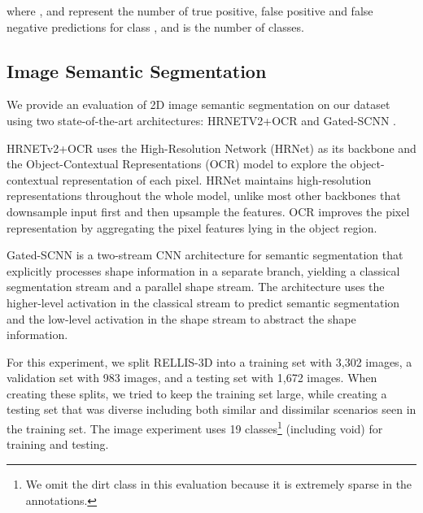 \documentclass[letterpaper, 10 pt, conference]{ieeeconf}
\begin{document}
where ,  and  represent the number of true positive, false positive and false negative predictions for class , and  is the number of classes.

\subsection{Image Semantic Segmentation}
We provide an evaluation of 2D image semantic segmentation on our dataset using two state-of-the-art architectures: HRNETV2+OCR \cite{WangSCJDZLMTWLX19, Yuan2019} and Gated-SCNN \cite{Takikawa2019}.

 HRNETv2+OCR uses the High-Resolution Network (HRNet)\cite{WangSCJDZLMTWLX19} as its backbone and the Object-Contextual Representations (OCR) model \cite{Yuan2019} to explore the object-contextual representation of each pixel. HRNet maintains high-resolution representations throughout the whole model, unlike most other backbones that downsample input first and then upsample the features. OCR improves the pixel representation by aggregating the pixel features lying in the object region. 

Gated-SCNN\cite{Takikawa2019} is a two-stream CNN architecture for semantic segmentation that explicitly processes shape information in a separate branch, yielding a classical segmentation stream and a parallel shape stream. The architecture uses the higher-level activation in the classical stream to predict semantic segmentation and the low-level activation in the shape stream to abstract the shape information.

For this experiment, we split RELLIS-3D into a training set with 3,302 images, a validation set with 983 images, and a testing set with 1,672 images. When creating these splits, we tried to keep the training set large, while creating a testing set that was diverse including both similar and dissimilar scenarios seen in the training set. The image experiment uses 19 classes\footnote{We omit the dirt class in this evaluation because it is extremely sparse in the annotations.} (including void) for training and testing.
\end{document}
